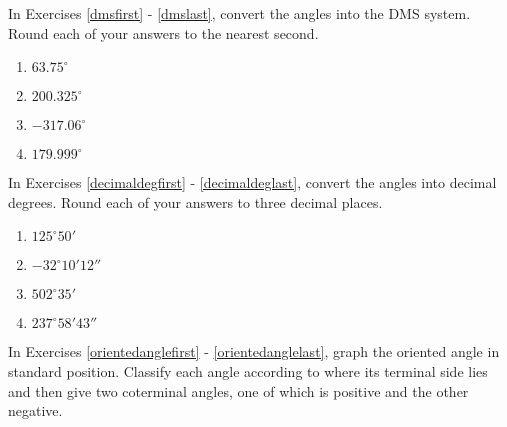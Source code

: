 \label{ExercisesforAppAngles}

In Exercises \ref{dmsfirst} - \ref{dmslast}, convert the angles into the DMS system.  Round each of your answers to the nearest second.

\begin{multicols}{4} 

\begin{enumerate}

\item $63.75^{\circ}$ \label{dmsfirst}
\item $200.325^{\circ}$
\item $-317.06^{\circ}$
\item $179.999^{\circ}$ \label{dmslast}

\setcounter{HW}{\value{enumi}}

\end{enumerate}

\end{multicols}

In Exercises \ref{decimaldegfirst} - \ref{decimaldeglast}, convert the angles into decimal degrees.  Round each of your answers to three decimal places.

\begin{multicols}{4} 

\begin{enumerate}

\setcounter{enumi}{\value{HW}}

\item $125^{\circ} 50'$ \label{decimaldegfirst}
\item $-32^{\circ} 10' 12''$
\item $502^{\circ} 35'$
\item $237^{\circ} 58' 43''$ \label{decimaldeglast}

\setcounter{HW}{\value{enumi}}

\end{enumerate}

\end{multicols}

In Exercises \ref{orientedanglefirst} - \ref{orientedanglelast}, graph the oriented angle in standard position. Classify each angle according to where its terminal side lies and then give two coterminal angles, one of which is positive and the other negative.

